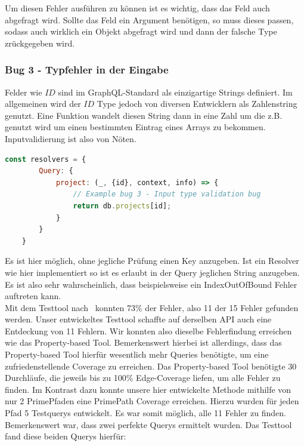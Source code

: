Um diesen Fehler ausführen zu können ist es wichtig, dass das Feld auch abgefragt wird.
Sollte das Feld ein Argument benötigen, so muss dieses passen, sodass auch wirklich ein Objekt abgefragt wird und dann der falsche Type zrückgegeben wird.

\subsubsection{Bug 3 - Typfehler in der Eingabe}

Felder wie $ID$ sind im GraphQL-Standard als einzigartige Strings definiert.
Im allgemeinen wird der $ID$ Type jedoch von diversen Entwicklern als Zahlenstring genutzt.
Eine Funktion wandelt diesen String dann in eine Zahl um die z.B. genutzt wird um einen bestimmten Eintrag eines Arrays zu bekommen.
Inputvalidierung ist also von Nöten.

\begin{lstlisting}[language=javascript]
    const resolvers = {
        Query: {
            project: (_, {id}, context, info) => {
                // Example bug 3 - Input type validation bug
                return db.projects[id];
            }
        }
    }
\end{lstlisting}

Es ist hier möglich, ohne jegliche Prüfung einen Key anzugeben.
Ist ein Resolver wie hier implementiert so ist es erlaubt in der Query jeglichen String anzugeben.
Es ist also sehr wahrscheinlich, dass beispielsweise ein IndexOutOfBound Fehler auftreten kann.
\\

Mit dem Testtool nach~\cite[Property-based Testing]{property-based-testing} konnten 73\% der Fehler, also 11 der 15 Fehler gefunden  werden.
Unser entwickeltes Testtool schaffte auf derselben API auch eine Entdeckung von 11 Fehlern.
Wir konnten also dieselbe Fehlerfindung erreichen wie das Property-based Tool.
Bemerkenswert hierbei ist allerdings, dass das Property-based Tool hierfür wesentlich mehr Queries benötigte, um eine zufriedenstellende Coverage zu erreichen.
Das Property-based Tool benötigte 30 Durchläufe, die jeweils bis zu 100\% Edge-Coverage liefen, um alle Fehler zu finden.
Im Kontrast dazu konnte unsere hier entwickelte Methode mithilfe von nur 2 PrimePfaden eine PrimePath Coverage erreichen.
Hierzu wurden für jeden Pfad 5 Testquerys entwickelt.
Es war somit möglich, alle 11 Fehler zu finden.
Bemerkenswert war, dass zwei perfekte Querys ermittelt wurden.
Das Testtool fand diese beiden Querys hierfür: \\

